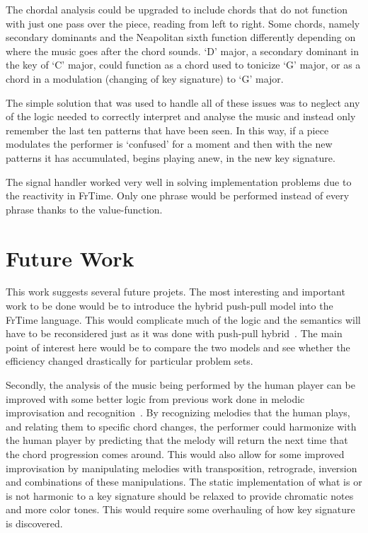 \documentclass[12pt]{ucthesis}
\begin{document}
The chordal analysis could be upgraded to include chords that do not function with just one pass over the piece, reading from left to right. Some chords, namely secondary dominants and the Neapolitan sixth function differently depending on where the music goes after the chord sounds. `D' major, a secondary dominant in the key of `C' major, could function as a chord used to tonicize `G' major, or as a chord in a modulation (changing of key signature) to `G' major. 

The simple solution that was used to handle all of these issues was to neglect any of the logic needed to correctly interpret and analyse the music and instead only remember the last ten patterns that have been seen. In this way, if a piece modulates the performer is `confused' for a moment and then with the new patterns it has accumulated, begins playing anew, in the new key signature. 

The signal handler worked very well in solving implementation problems due to the reactivity in FrTime. Only one phrase would be performed instead of every phrase thanks to the value-function.

\chapter{Future Work}
\label{future}

This work suggests several future projets. The most interesting and important work to be done would be to introduce the hybrid push-pull model into the FrTime language. This would complicate much of the logic and the semantics will have to be reconsidered just as it was done with push-pull hybrid~\cite{push-pull-frp}. The main point of interest here would be to compare the two models and see whether the efficiency changed drastically for particular problem sets. 

Secondly, the analysis of the music being performed by the human player can be improved with some better logic from previous work done in melodic improvisation and recognition~\cite{MelodicRecognition}. By recognizing melodies that the human plays, and relating them to specific chord changes, the performer could harmonize with the human player by predicting that the melody will return the next time that the chord progression comes around. This would also allow for some improved improvisation by manipulating melodies with transposition, retrograde, inversion and combinations of these manipulations. The static implementation of what is or is not harmonic to a key signature should be relaxed to provide chromatic notes and more color tones. This would require some overhauling of how key signature is discovered. 
\end{document}
